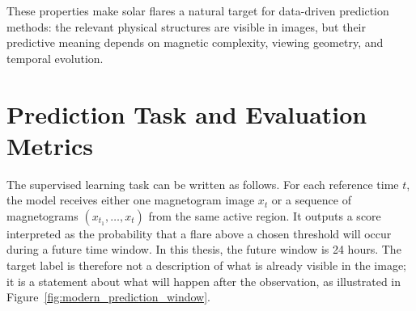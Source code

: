 These properties make solar flares a natural target for data-driven prediction methods: the relevant physical structures are visible in images, but their predictive meaning depends on magnetic complexity, viewing geometry, and temporal evolution.

\section{Prediction Task and Evaluation Metrics}

The supervised learning task can be written as follows. For each reference time $t$, the model receives either one magnetogram image $x_t$ or a sequence of magnetograms $(x_{t_1}, \ldots, x_t)$ from the same active region. It outputs a score interpreted as the probability that a flare above a chosen threshold will occur during a future time window. In this thesis, the future window is 24 hours. The target label is therefore not a description of what is already visible in the image; it is a statement about what will happen after the observation, as illustrated in Figure~\ref{fig:modern_prediction_window}.

